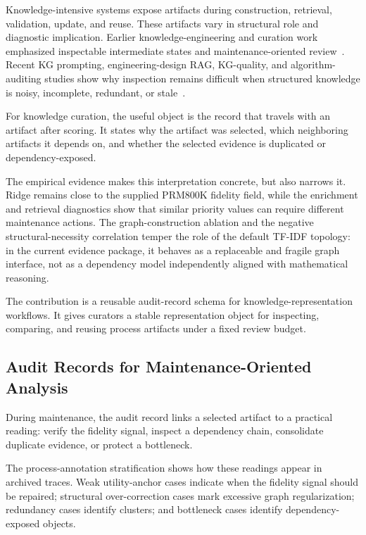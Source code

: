 \documentclass[a4paper,fleqn]{cas-sc}
\begin{document}
Knowledge-intensive systems expose artifacts during construction, retrieval, validation, update, and reuse. These artifacts vary in structural role and diagnostic implication. Earlier knowledge-engineering and curation work emphasized inspectable intermediate states and maintenance-oriented review~\cite{buchanan1984mycin,laird2012soar,studer1998knowledge,higgins2008dcc}. Recent KG prompting, engineering-design RAG, KG-quality, and algorithm-auditing studies show why inspection remains difficult when structured knowledge is noisy, incomplete, redundant, or stale~\cite{dai2025llmkg,siddharth2024retrieval,chen2025kgquality,dwivedi2021artificial,raji2020closing}.

For knowledge curation, the useful object is the record that travels with an artifact after scoring. It states why the artifact was selected, which neighboring artifacts it depends on, and whether the selected evidence is duplicated or dependency-exposed.

The empirical evidence makes this interpretation concrete, but also narrows it. Ridge remains close to the supplied PRM800K fidelity field, while the enrichment and retrieval diagnostics show that similar priority values can require different maintenance actions. The graph-construction ablation and the negative structural-necessity correlation temper the role of the default TF-IDF topology: in the current evidence package, it behaves as a replaceable and fragile graph interface, not as a dependency model independently aligned with mathematical reasoning.

The contribution is a reusable audit-record schema for knowledge-representation workflows. It gives curators a stable representation object for inspecting, comparing, and reusing process artifacts under a fixed review budget.

\subsection{Audit Records for Maintenance-Oriented Analysis}
\label{sec:audit-interpretation}

During maintenance, the audit record links a selected artifact to a practical reading: verify the fidelity signal, inspect a dependency chain, consolidate duplicate evidence, or protect a bottleneck.

The process-annotation stratification shows how these readings appear in archived traces. Weak utility-anchor cases indicate when the fidelity signal should be repaired; structural over-correction cases mark excessive graph regularization; redundancy cases identify clusters; and bottleneck cases identify dependency-exposed objects.
\end{document}
